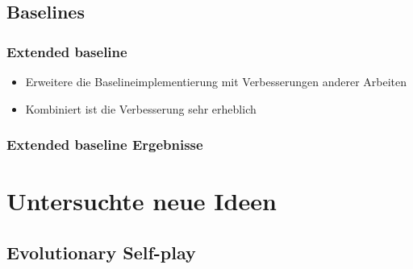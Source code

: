 \subsection{Baselines}



\begin{frame}
 \frametitle{Extended baseline}
  


\begin{itemize}
  \item \pause Erweitere die Baselineimplementierung mit Verbesserungen anderer Arbeiten
  \item \pause Kombiniert ist die Verbesserung sehr erheblich
\end{itemize}

  
\end{frame}
\begin{frame}
 \frametitle{Extended baseline Ergebnisse}
  



  
\end{frame}

\section{Untersuchte neue Ideen}




\subsection{Evolutionary Self-play}




